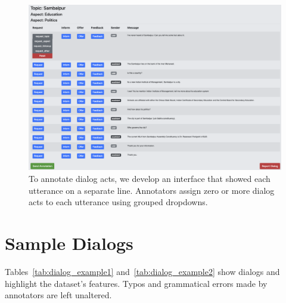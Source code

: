 \begin{figure}[ht]
    \centering
    \includegraphics[width=\linewidth]{2020_emnlp_curiosity/figures/da-interface}
    \caption{
        To annotate dialog acts, we develop an interface that showed each utterance on a separate line.
        Annotators assign zero or more dialog acts to each utterance using grouped dropdowns.
    }
    \label{fig:da-iface}
\end{figure}


\section{Sample Dialogs}
\label{apx:samples}
Tables~\ref{tab:dialog_example1} and~\ref{tab:dialog_example2} show \rover{} dialogs and highlight the dataset's features.
Typos and grammatical errors made by annotators are left unaltered.

